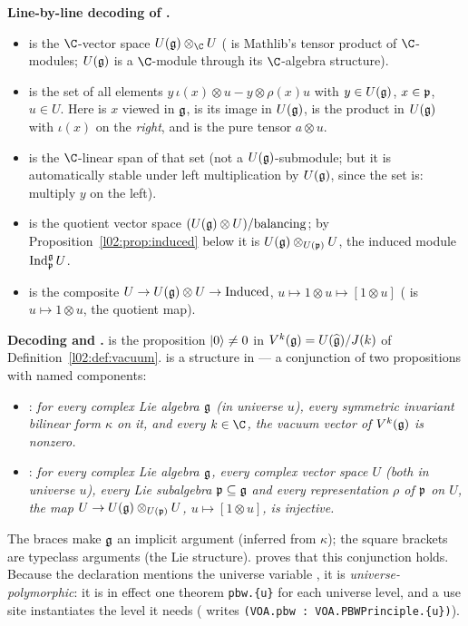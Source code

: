 \begin{dictionary}
\textbf{Line-by-line decoding of .}
\begin{itemize}
\item {} is the $\C$-vector space $U(\ltwog)\otimes_\C U$ ( is Mathlib's
  tensor product of $\C$-modules; $U(\mathfrak{g})$ is a $\C$-module through its $\C$-algebra structure).
\item {} is the set of all elements $y\,\iota(x)\otimes u - y\otimes\rho(x)u$
  with $y\in U(\mathfrak{g})$, $x\in\mathfrak{p}$, $u\in U$. Here  is $x$ viewed in $\mathfrak{g}$,
   is its image in $U(\mathfrak{g})$,  is the
  product in $U(\mathfrak{g})$ with $\iota(x)$ on the \emph{right}, and  is the pure
  tensor $a\otimes u$.
\item {} is the $\C$-linear span of that set (not a $U(\mathfrak{g})$-submodule; but it is
  automatically stable under left multiplication by $U(\mathfrak{g})$, since the set is: multiply $y$ on the
  left).
\item {} is the quotient vector space $(U(\mathfrak{g})\otimes U)/\text{balancing}$; by
  Proposition~\ref{l02:prop:induced} below it is $U(\mathfrak{g})\otimes_{U(\mathfrak{p})}U$, the induced module
  $\operatorname{Ind}_{\mathfrak{p}}^{\mathfrak{g}} U$.
\item {} is the composite $U\to U(\mathfrak{g})\otimes U\to\text{Induced}$,
  $u\mapsto 1\otimes u\mapsto[1\otimes u]$ ( is $u\mapsto 1\otimes u$,
   the quotient map).
\end{itemize}
\textbf{Decoding  and .}  is the proposition
$|0\rangle\ne0$ in $V^k(\mathfrak{g}) = U(\widehat{\mathfrak{g}})/J(k)$ of Definition~\ref{l02:def:vacuum}.
 is a structure in  --- a conjunction of two propositions with named
components:
\begin{itemize}
\item[(A)] : \emph{for every complex Lie algebra $\mathfrak{g}$ (in universe $u$), every
  symmetric invariant bilinear form $\kappa$ on it, and every $k\in\C$, the vacuum vector of
  $V^k(\mathfrak{g})$ is nonzero.}
\item[(B)] : \emph{for every complex Lie algebra $\mathfrak{g}$, every complex vector space
  $U$ (both in universe $u$), every Lie subalgebra $\mathfrak{p}\subseteq\mathfrak{g}$ and every representation
  $\rho$ of $\mathfrak{p}$ on $U$, the map $U\to U(\mathfrak{g})\otimes_{U(\mathfrak{p})}U$, $u\mapsto[1\otimes u]$, is
  injective.}
\end{itemize}
The braces  make $\mathfrak{g}$ an implicit argument (inferred from $\kappa$); the
square brackets are typeclass arguments (the Lie structure).  proves
that this conjunction holds. Because the declaration mentions the universe variable , it is
\emph{universe-polymorphic}: it is in effect one theorem \texttt{pbw.\{u\}} for each universe level, and a
use site instantiates the level it needs (\allowbreak{} writes
\texttt{(VOA.pbw : VOA.PBWPrinciple.\{u\})}).


\end{dictionary}

